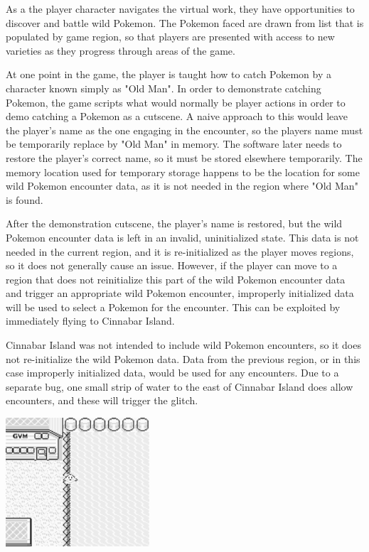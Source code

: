 \documentclass[letterpaper]{article}
\begin{document}
As a the player character navigates the virtual work, they have opportunities to discover and battle wild Pokemon. The Pokemon faced are drawn from list that is populated by game region, so that players are presented with access to new varieties as they progress through areas of the game.

At one point in the game, the player is taught how to catch Pokemon by a character known simply as "Old Man". In order to demonstrate catching Pokemon, the game scripts what would normally be player actions in order to demo catching a Pokemon as a cutscene. A naive approach to this would leave the player's name as the one engaging in the encounter, so the players name must be temporarily replace by "Old Man" in memory. The software later needs to restore the player's correct name, so it must be stored elsewhere temporarily. The memory location used for temporary storage happens to be the location for some wild Pokemon encounter data, as it is not needed in the region where "Old Man" is found.

After the demonstration cutscene, the player's name is restored, but the wild Pokemon encounter data is left in an invalid, uninitialized state. This data is not needed in the current region, and it is re-initialized as the player moves regions, so it does not generally cause an issue. However, if the player can move to a region that does not reinitialize this part of the wild Pokemon encounter data and trigger an appropriate wild Pokemon encounter, improperly initialized data will be used to select a Pokemon for the encounter. This can be exploited by immediately flying to Cinnabar Island.

Cinnabar Island was not intended to include wild Pokemon encounters, so it does not re-initialize the wild Pokemon data. Data from the previous region, or in this case improperly initialized data, would be used for any encounters. Due to a separate bug, one small strip of water to the east of Cinnabar Island does allow encounters, and these will trigger the glitch.

\noindent %
\begin{minipage}{\textwidth}
    \centering
    \includegraphics[width=0.4\textwidth]{surfing.png}
    \label{fig:surfing}
\end{minipage}
\end{document}
